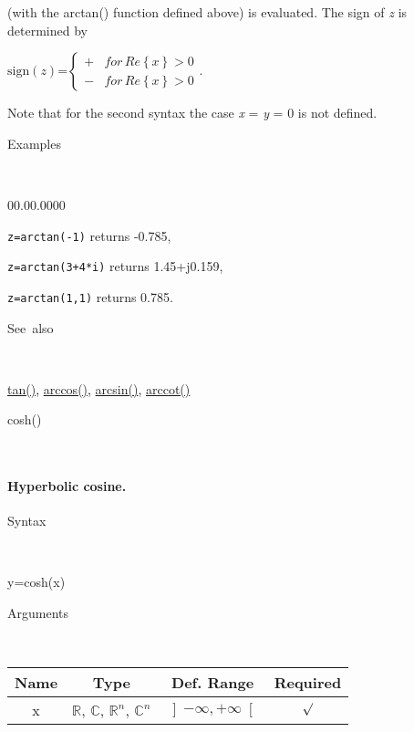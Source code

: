 \noindent (with the arctan() function defined above) is evaluated.
The sign of \textit{z} is determined by

\medskip{}
$\textrm{sign}(z)$=$\left\{ \begin{array}{cc}
+ & for\, Re\left\{ x\right\} >0\\
- & for\, Re\left\{ x\right\} >0\end{array}\right.$.
\medskip{}

\noindent Note that for the second syntax the case \textit{x} = \textit{y}
= 0 is not defined.

\begin{description}
\item [Examples]~
\end{description}
\begin{lyxlist}{00.00.0000}
\item [\texttt{z=arctan(-1)}]returns -0.785,
\item [\texttt{z=arctan(3+4{*}i)}]returns 1.45+j0.159,
\item [\texttt{z=arctan(1,1)}]returns 0.785.
\end{lyxlist}
\begin{description}
\item [See~also]~
\end{description}
\textcolor{blue}{\hyperlink{tan}{tan()}}\textcolor{black}{,} \textcolor{blue}{\hyperlink{arccos}{arccos()}}\textcolor{black}{,}
\textcolor{blue}{\hyperlink{arcsin}{arcsin()}}\textcolor{black}{,}
\textcolor{blue}{\hyperlink{arccot}{arccot()}}


\newpage
{}

\begin{description}
\item [\hypertarget{cosh}{}{\Large cosh()}]~{\Large \par}
\end{description}

\paragraph{\label{par:Hyperbolic-cosine}Hyperbolic cosine.}

\begin{description}
\item [Syntax]~
\end{description}
y=cosh(x)

\begin{description}
\item [Arguments]~
\end{description}
\begin{tabular}{|c|c|c|c|}
\hline 
Name&
Type&
Def. Range&
Required\tabularnewline
\hline
\hline 
x&
$\mathbb{R}$, $\mathbb{C}$, $\mathbb{R}^{n}$, $\mathbb{C}^{n}$&
$\left]-\infty,+\infty\right[$&
$\surd$\tabularnewline
\hline
\end{tabular}

